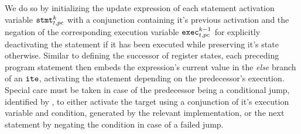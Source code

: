 We do so by initializing the update expression of each statement activation variable $\texttt{stmt}^k_{t, pc}$ with a conjunction containing it's previous activation and the negation of the corresponding execution variable $\texttt{exec}^{k - 1}_{t, pc}$ for explicitly deactivating the statement if it has been executed while preserving it's state otherwise.
Similar to defining the successor of register states, each preceding program statement then embeds the expression's current value in the \emph{else} branch of an $\texttt{ite}$, activating the statement depending on the predecessor's execution.
Special care must be taken in case of the predecessor being a conditional jump, identified by , to either activate the target using a conjunction of it's execution variable and condition, generated by the relevant  implementation, or the next statement by negating the condition in case of a failed jump.

